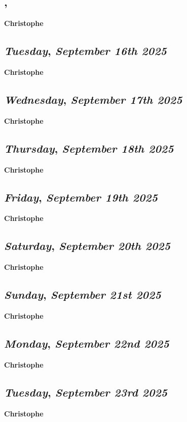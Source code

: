 \subsection*{\weekday, \day}
\textbf {Christophe}

\def\day{\textit{September 16th 2025}}
\def\weekday{\textit{Tuesday}}
\subsection*{\weekday, \day}
\textbf {Christophe}

\def\day{\textit{September 17th 2025}}
\def\weekday{\textit{Wednesday}}
\subsection*{\weekday, \day}
\textbf {Christophe}

\def\day{\textit{September 18th 2025}}
\def\weekday{\textit{Thursday}}
\subsection*{\weekday, \day}
\textbf {Christophe}

\def\day{\textit{September 19th 2025}}
\def\weekday{\textit{Friday}}
\subsection*{\weekday, \day}
\textbf {Christophe}

\def\day{\textit{September 20th 2025}}
\def\weekday{\textit{Saturday}}
\subsection*{\weekday, \day}
\textbf {Christophe}

\def\day{\textit{September 21st 2025}}
\def\weekday{\textit{Sunday}}
\subsection*{\weekday, \day}
\textbf {Christophe}

\def\day{\textit{September 22nd 2025}}
\def\weekday{\textit{Monday}}
\subsection*{\weekday, \day}
\textbf {Christophe}

\def\day{\textit{September 23rd 2025}}
\def\weekday{\textit{Tuesday}}
\subsection*{\weekday, \day}
\textbf {Christophe}

